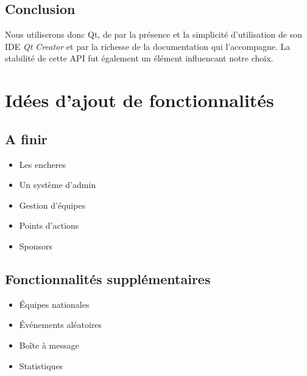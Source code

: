 \documentclass[a4paper]{report}
\begin{document}
\section{Conclusion}
Nous utiliserons donc Qt, de par la présence et la simplicité d'utilisation de son IDE \textit{Qt Creator} et par la richesse de la documentation qui l'accompagne. La stabilité de cette API fut également un élément influencant notre choix.

\chapter{Idées d'ajout de fonctionnalités}
\section{A finir}
\begin{itemize}
    \item Les \glspl{enchere}
    \item Un système d'admin
    \item Gestion d'équipes
    \item Points d'actions
    \item Sponsors
\end{itemize}
\section {Fonctionnalités supplémentaires}
\begin{itemize}
    \item Équipes nationales
    \item Événements aléatoires
    \item Boîte à message
    \item Statistiques
\end{itemize}



\printindex
\listoffigures
\end{document}
